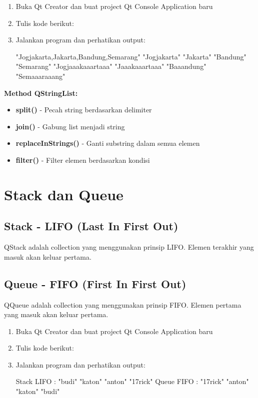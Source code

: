 \begin{enumerate}
\item Buka Qt Creator dan buat project Qt Console Application baru
\item Tulis kode berikut:



\item Jalankan program dan perhatikan output:

\begin{lcverbatim}
"Jogjakarta,Jakarta,Bandung,Semarang"
"Jogjakarta"
"Jakarta"
"Bandung"
"Semarang"
"Jogjaaakaaartaaa"
"Jaaakaaartaaa"
"Baaandung"
"Semaaaraaang"
\end{lcverbatim}
\end{enumerate}

\textbf{Method QStringList:}
\begin{itemize}
\item \textbf{split()} - Pecah string berdasarkan delimiter
\item \textbf{join()} - Gabung list menjadi string
\item \textbf{replaceInStrings()} - Ganti substring dalam semua elemen
\item \textbf{filter()} - Filter elemen berdasarkan kondisi
\end{itemize}

\section{Stack dan Queue}

\subsection{Stack - LIFO (Last In First Out)}

QStack adalah collection yang menggunakan prinsip LIFO. Elemen terakhir yang masuk akan keluar pertama.

\subsection{Queue - FIFO (First In First Out)}

QQueue adalah collection yang menggunakan prinsip FIFO. Elemen pertama yang masuk akan keluar pertama.

\begin{enumerate}
\item Buka Qt Creator dan buat project Qt Console Application baru
\item Tulis kode berikut:



\item Jalankan program dan perhatikan output:

\begin{lcverbatim}
Stack LIFO :
"budi"
"katon"
"anton"
"17rick"
Queue FIFO :
"17rick"
"anton"
"katon"
"budi"
\end{lcverbatim}
\end{enumerate}

